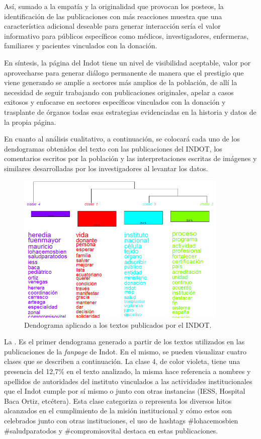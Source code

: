 \documentclass[spanish]{textolivre}
\begin{document}
Así, sumado a la empatía y la originalidad que provocan los posteos, la identificación de las publicaciones con más reacciones muestra que una característica adicional deseable para generar interacción sería el valor informativo para públicos específicos como médicos, investigadores, enfermeras, familiares y pacientes vinculados con la donación. 

En síntesis, la página del Indot tiene un nivel de visibilidad aceptable, valor por aprovecharse para generar diálogo permanente de manera que el prestigio que viene generando se amplíe a sectores más amplios de la población, de allí la necesidad de seguir trabajando con publicaciones originales, apelar a casos exitosos y enfocarse en sectores específicos vinculados con la donación y trasplante de órganos todas esas estrategias evidenciadas en la historia y datos de la propia página. 

En cuanto al análisis cualitativo, a continuación, se colocará cada uno de los dendogramas obtenidos del texto con las publicaciones del INDOT, los comentarios escritos por la población y las interpretaciones escritas de imágenes y similares desarrolladas por los investigadores al levantar los datos.

\begin{figure}[htbp]
 \centering
 \includegraphics[width=0.9\textwidth]{figure01.png}
 \caption{Dendograma aplicado a los textos publicados por el INDOT.}
 \label{fig1}
\end{figure}

La . Es el primer dendograma generado a partir de los textos utilizados en las publicaciones de la \emph{fanpage} de Indot. En el mismo, se pueden visualizar cuatro clases que se describen a continuación. La clase 4, de color violeta, tiene una presencia del 12,7\% en el texto analizado, la misma hace referencia a nombres y apellidos de autoridades del instituto vinculados a las actividades institucionales que el Indot cumple por sí mismo o junto con otras instancias (IESS, Hospital Baca Ortiz, etcétera). Esta clase categoriza o representa los diversos hitos alcanzados en el cumplimiento de la misión institucional y cómo estos son celebrados junto con otras instituciones, el uso de hashtags \#lohacemosbien \#saludparatodos y \#compromisovital destaca en estas publicaciones. 
\end{document}
